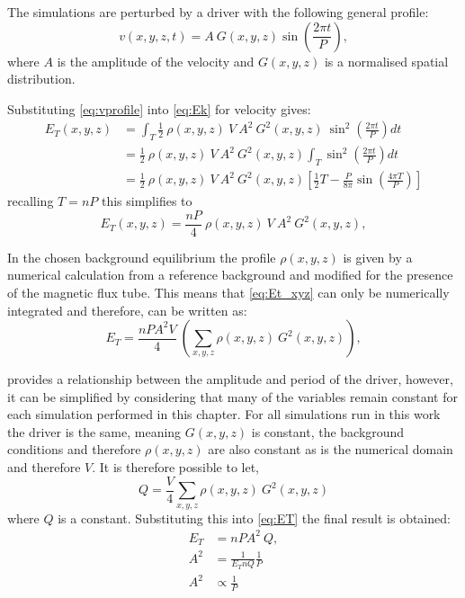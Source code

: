 The simulations are perturbed by a driver with the following general profile:
\begin{equation}
    v(x,y,z,t) = A\ G(x,y,z) \sin \left( \frac{2\pi t}{P} \right),\label{eq:vprofile}
\end{equation}
where $A$ is the amplitude of the velocity and $G(x,y,z)$ is a normalised spatial distribution.

Substituting \cref{eq:vprofile} into \cref{eq:Ek} for velocity gives:
\begin{align}
    E_{T}(x,y,z) &= \int_T \frac{1}{2}\ \rho(x,y,z)\ V\ A^2\ G^2(x,y,z)\ \sin^2\left(\frac{2\pi t}{P} \right) dt \\
    &= \frac{1}{2}\ \rho(x,y,z)\ V\ A^2\ G^2(x,y,z) \int_T \sin^2\left(\frac{2\pi t}{P} \right) dt \\
    & = \frac{1}{2}\ \rho(x,y,z)\ V\ A^2\ G^2(x,y,z) \left[ \frac{1}{2}T - \frac{P}{8\pi} \sin \left(\frac{4\pi T}{P} \right) \right]
\end{align}
recalling $T = nP$ this simplifies to 
\begin{equation}
    E_{T}(x,y,z) = \frac{nP}{4}\ \rho(x,y,z)\ V\ A^2\ G^2(x,y,z), \label{eq:Et_xyz}
\end{equation}

In the chosen background equilibrium the profile $\rho(x,y,z)$ is given by a numerical calculation from a reference background and modified for the presence of the magnetic flux tube.
This means that \cref{eq:Et_xyz} can only be numerically integrated and therefore, can be written as:
\begin{equation}
    E_T = \frac{nPA^2V}{4}\ \left( \sum_{x,y,z} \rho(x,y,z)\ G^2(x,y,z) \right),\label{eq:ET}
\end{equation}

 provides a relationship between the amplitude and period of the driver, however, it can be simplified by considering that many of the variables remain constant for each simulation performed in this chapter.
For all simulations run in this work the driver is the same, meaning $G(x,y,z)$ is constant, the background conditions and therefore $\rho(x,y,z)$ are also constant as is the numerical domain and therefore $V$.
It is therefore possible to let,
\begin{equation}
    Q = \frac{V}{4} \sum_{x,y,z} \rho(x,y,z)\ G^2(x,y,z)
\end{equation}
where $Q$ is a constant.
Substituting this into \cref{eq:ET} the final result is obtained:
\begin{align}
    E_T &= nPA^2\ Q, \\
    A^2 &= \frac{1}{E_T n Q} \frac{1}{P} \\
    A^2 &\propto \frac{1}{P}
\end{align}

